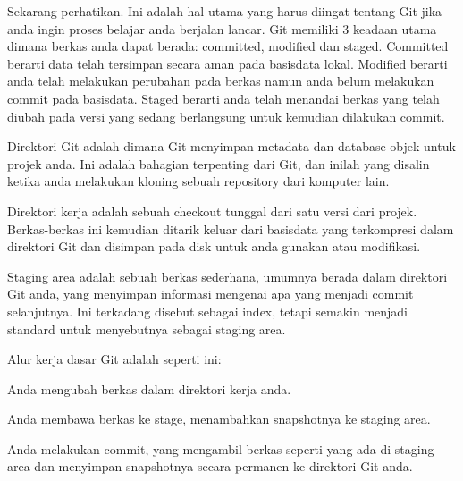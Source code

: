  \par
\noindent 
{\fontsize{14pt}{14pt}\selectfont Sekarang perhatikan. Ini adalah hal utama yang harus diingat tentang Git jika anda ingin proses belajar anda berjalan lancar. Git memiliki 3 keadaan utama dimana berkas anda dapat berada: committed, modified dan staged. Committed berarti data telah tersimpan secara aman pada basisdata lokal. Modified berarti anda telah melakukan perubahan pada berkas namun anda belum melakukan commit pada basisdata. Staged berarti anda telah menandai berkas yang telah diubah pada versi yang sedang berlangsung untuk kemudian dilakukan commit. \\} \par
\vspace{14pt}
\vspace{14pt}
\noindent 
{\fontsize{14pt}{14pt}\selectfont Direktori Git adalah dimana Git menyimpan metadata dan database objek untuk projek anda. Ini adalah bahagian terpenting dari Git, dan inilah yang disalin ketika anda melakukan kloning sebuah repository dari komputer lain. \\} \par
\noindent 
{\fontsize{14pt}{14pt}\selectfont Direktori kerja adalah sebuah checkout tunggal dari satu versi dari projek. Berkas-berkas ini kemudian ditarik keluar dari basisdata yang terkompresi dalam direktori Git dan disimpan pada disk untuk anda gunakan atau modifikasi. \\} \par
\noindent 
{\fontsize{14pt}{14pt}\selectfont Staging area adalah sebuah berkas sederhana, umumnya berada dalam direktori Git anda, yang menyimpan informasi mengenai apa yang menjadi commit selanjutnya. Ini terkadang disebut sebagai index, tetapi semakin menjadi standard untuk menyebutnya sebagai staging area. \\} \par
\noindent 
{\fontsize{14pt}{14pt}\selectfont Alur kerja dasar Git adalah seperti ini: \\} \par
\noindent 
{\fontsize{14pt}{14pt}\selectfont Anda mengubah berkas dalam direktori kerja anda. \\} \par
\noindent 
{\fontsize{14pt}{14pt}\selectfont Anda membawa berkas ke stage, menambahkan snapshotnya ke staging area. \\} \par
\noindent 
{\fontsize{14pt}{14pt}\selectfont Anda melakukan commit, yang mengambil berkas seperti yang ada di staging area dan menyimpan snapshotnya secara permanen ke direktori Git anda. \\} \par
